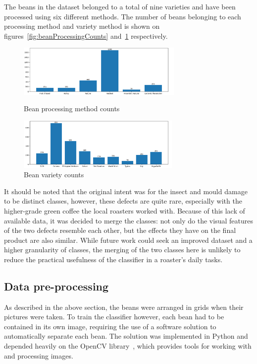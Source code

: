The beans in the dataset belonged to a total of nine varieties and have been processed using six different methods.
The number of beans belonging to each processing method and variety method is shown
on figures~\ref{fig:beanProcessingCounts} and~\ref{fig:beanVarietyCounts} respectively.
\begin{figure}[h]
	\centering
		\includegraphics[width=\linewidth, height=2.5cm]{
			./figures/methodology/processing-counts
		}
	\caption{Bean processing method counts}
	\label{fig:beanProcessingCounts}

	\includegraphics[width=\linewidth, height=2.5cm]{
			./figures/methodology/variety-counts
		}
	\caption{Bean variety counts}
	\label{fig:beanVarietyCounts}
\end{figure}

It should be noted that the original intent was for the insect and mould damage to be distinct classes,
however, these defects are quite rare, especially with the higher-grade green coffee the local roasters worked with.
Because of this lack of available data, it was decided to merge the classes: not only do the visual features of the two
defects resemble each other, but the effects they have on the final product are also similar.
While future work could seek an improved dataset and a higher granularity of classes, the merging of the two classes here
is unlikely to reduce the practical usefulness of the classifier in a roaster's daily tasks.
\subsection{Data pre-processing}
\label{subsec:data-pre-processing}
As described in the above section, the beans were arranged in grids when their pictures were taken.
To train the classifier however, each bean had to be contained in its own image, requiring the use of a software solution
to automatically separate each bean.
The solution was implemented in Python and depended heavily on the OpenCV library~\cite{opencvLibrary}, which provides
tools for working with and processing images.

